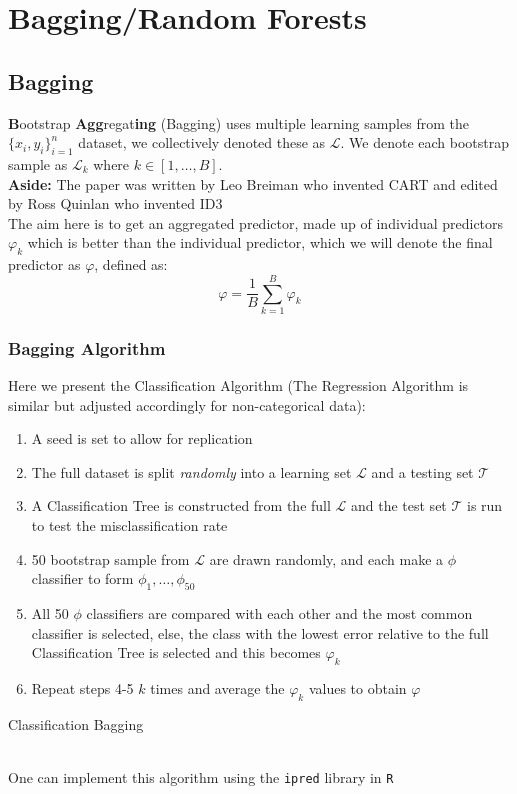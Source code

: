 \documentclass[11pt,a4paper]{report}
\begin{document}
\section{Bagging/Random Forests}
\subsection{Bagging}
\textbf{B}ootstrap \textbf{Agg}regat\textbf{ing} (Bagging) \cite{bagging} uses multiple learning samples from the $\{x_{i}, y_{i}\}_{i=1}^{n}$ dataset, we collectively denoted these as $\mathcal{L}$. 
We denote each bootstrap sample as $\mathcal{L}_k$ where $k \in [1, \dots, B]$.
\medskip\\
{\color{gray} \textbf{Aside:} The paper was written by Leo Breiman who invented CART and edited by Ross Quinlan who invented ID3}
\medskip\\
The aim here is to get an aggregated predictor, made up of individual predictors $\varphi_k$ which is better than the individual predictor, which we will denote the final predictor as $\varphi$, defined as:
\begin{equation}
    \varphi = \frac{1}{B} \sum_{k=1}^{B} \varphi_k
\end{equation}

\subsubsection{Bagging Algorithm}
Here we present the Classification Algorithm (The Regression Algorithm is similar but adjusted accordingly for non-categorical data):
\begin{algorithm}
\begin{enumerate}
    \item A seed is set to allow for replication
    
    \item The full dataset is split \textit{randomly} into a learning set $\mathcal{L}$ and a testing set $\mathcal{T}$
    
    \item A Classification Tree is constructed from the full $\mathcal{L}$ and the test set $\mathcal{T}$ is run to test the misclassification rate
    
    \item 50 bootstrap sample from $\mathcal{L}$ are drawn randomly, and each make a $\phi$ classifier to form $\phi_1, \dots, \phi_{50}$
    
    \item All 50 $\phi$ classifiers are compared with each other and the most common classifier is selected, else, the class with the lowest error relative to the full Classification Tree is selected and this becomes $\varphi_k$
    
    \item Repeat steps 4-5 $k$ times and average the $\varphi_k$ values to obtain $\varphi$
\end{enumerate}
\caption{Classification Bagging}
\end{algorithm}\\
One can implement this algorithm using the {\color{blue} \texttt{ipred}} library in {\color{blue} \texttt{R}}
\end{document}
